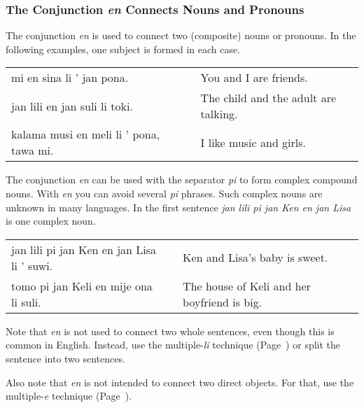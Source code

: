 %
\subsubsection*{The Conjunction \textit{en} Connects Nouns and Pronouns}
%
%
The conjunction \textit{en} is used to connect two (composite) nouns or pronouns.
In the following examples, one subject is formed in each case.

\begin{supertabular}{p{5,5cm}|ll}
    mi en sina li ' jan pona.               &  & You and I are friends.               \\
    jan lili en jan suli li toki.           &  & The child and the adult are talking. \\
    kalama musi en meli li ' pona, tawa mi. &  & I like music and girls.              \\
\end{supertabular}

The conjunction \textit{en} can be used with the separator \textit{pi} to form complex compound nouns.
With \textit{en} you can avoid several \textit{pi} phrases.
Such complex nouns are unknown in many languages.
In the first sentence \textit{jan lili pi jan Ken en jan Lisa} is one complex noun.

\begin{supertabular}{p{5,5cm}|ll}
    jan lili pi jan Ken en jan Lisa li ' suwi. &  & Ken and Lisa's baby is sweet.               \\
    tomo pi jan Keli en mije ona li suli.      &  & The house of Keli and her boyfriend is big. \\
\end{supertabular}
%

Note that \textit{en} is not used to connect two whole sentences, even though this is common in English.
Instead, use the multiple-\textit{li} technique  (Page~\pageref{'multiple_li'}) or split the sentence into two sentences.

Also note that \textit{en} is not intended to connect two direct objects.
For that, use the multiple-\textit{e} technique (Page~\pageref{'multiple_e'}).

%
